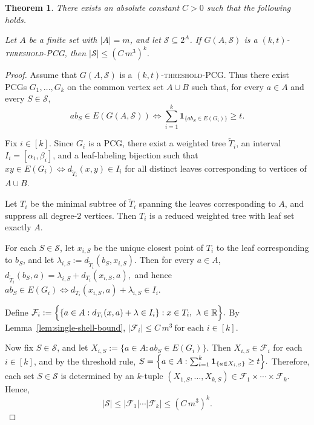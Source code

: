 \documentclass[10pt,a4paper]{amsart}
\newtheorem{theorem}{Theorem}
\begin{document}
\begin{theorem}\label{thm:threshold-set-system}
There exists an absolute constant $C>0$ such that the following holds.

Let $A$ be a finite set with $|A|=m$, and let $\mathcal S\subseteq 2^A$. If
$G(A,\mathcal S)$ is a \textsc{$(k,t)$-threshold-\textsc{PCG}}, then
\(
|\mathcal S|\le (C\,m^3)^k.
\)
\end{theorem}

\begin{proof}
Assume that $G(A,\mathcal S)$ is a \textsc{$(k,t)$-threshold-\textsc{PCG}}. Thus there
exist \textsc{PCG}s
\(
G_1,\dots,G_k
\)
on the common vertex set $A\cup B$ such that, for every $a\in A$ and every
$S\in\mathcal S$,
\[
ab_S\in E(G(A,\mathcal S))
\iff
\sum_{i=1}^k \mathbf 1_{\{ab_S\in E(G_i)\}} \ge t.
\]

Fix $i\in[k]$. Since $G_i$ is a \textsc{PCG}, there exist a weighted tree
$\widetilde T_i$, an interval $I_i=[\alpha_i,\beta_i]$, and a leaf-labeling bijection
such that
\(
xy\in E(G_i)
\iff
d_{\widetilde T_i}(x,y)\in I_i
\)
for all distinct leaves corresponding to vertices of $A\cup B$.

Let $T_i$ be the minimal subtree of $\widetilde T_i$ spanning the leaves corresponding
to $A$, and suppress all degree-$2$ vertices. Then $T_i$ is a reduced weighted tree with
leaf set exactly $A$.

For each $S\in\mathcal S$, let $x_{i,S}$ be the unique closest point of $T_i$ to the
leaf corresponding to $b_S$, and let
\(
\lambda_{i,S}:=d_{\widetilde T_i}(b_S,x_{i,S}).
\)
Then for every $a\in A$,
\(
d_{\widetilde T_i}(b_S,a)=\lambda_{i,S}+d_{T_i}(x_{i,S},a),
\)
and hence
\(
ab_S\in E(G_i)
\iff
d_{T_i}(x_{i,S},a)+\lambda_{i,S}\in I_i.
\)

Define
\(
\mathcal F_i:=
\Bigl\{
\{a\in A:d_{T_i}(x,a)+\lambda\in I_i\}: x\in T_i,\ \lambda\in\mathbb R
\Bigr\}.
\)
By Lemma~\ref{lem:single-shell-bound},
\(
|\mathcal F_i|\le C\,m^3
\ \text{for each }i\in[k].
\)

Now fix $S\in\mathcal S$, and let
\(
X_{i,S}:=\{a\in A:ab_S\in E(G_i)\}.
\)
Then $X_{i,S}\in\mathcal F_i$ for each $i\in[k]$, and by the threshold rule,
\(
S=
\Bigl\{
a\in A:
\sum_{i=1}^k \mathbf 1_{\{a\in X_{i,S}\}} \ge t
\Bigr\}.
\)
Therefore, each set $S\in\mathcal S$ is determined by an $k$-tuple
\(
(X_{1,S},\dots,X_{k,S})\in \mathcal F_1\times\cdots\times\mathcal F_k.
\)
Hence,
\[
|\mathcal S|
\le
|\mathcal F_1|\cdots |\mathcal F_k|
\le
(C\,m^3)^k.
\] \end{proof}
\end{document}
